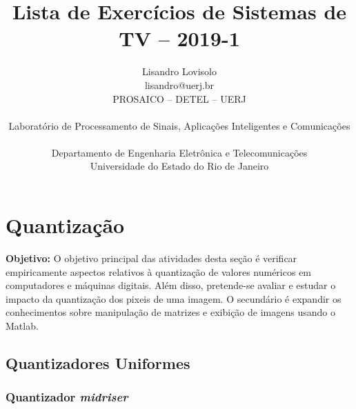 \documentclass[11pt]{article}
\begin{document}
 

\title{Lista de Exercícios de Sistemas de TV -- 2019-1}
\author{Lisandro Lovisolo \\ lisandro@uerj.br \\ PROSAICO -- DETEL -- UERJ \\ \begin{small} Laboratório de Processamento de Sinais, Aplicações Inteligentes e Comunicações \end{small} \\ Departamento de Engenharia Eletrônica e Telecomunicações \\ Universidade do Estado do Rio de Janeiro}

\maketitle

\section{Quantização}

\textbf{Objetivo:} O objetivo principal das atividades desta seção é verificar empiricamente aspectos relativos à quantização de valores numéricos em computadores e máquinas digitais. Além disso, pretende-se avaliar e estudar o impacto da quantização dos pixeis de uma imagem. O secundário é expandir os conhecimentos sobre manipulação de matrizes e exibição de imagens usando o \textsf{Matlab}.

\subsection{Quantizadores Uniformes}

\subsubsection{Quantizador \emph{midriser}}
\end{document}
